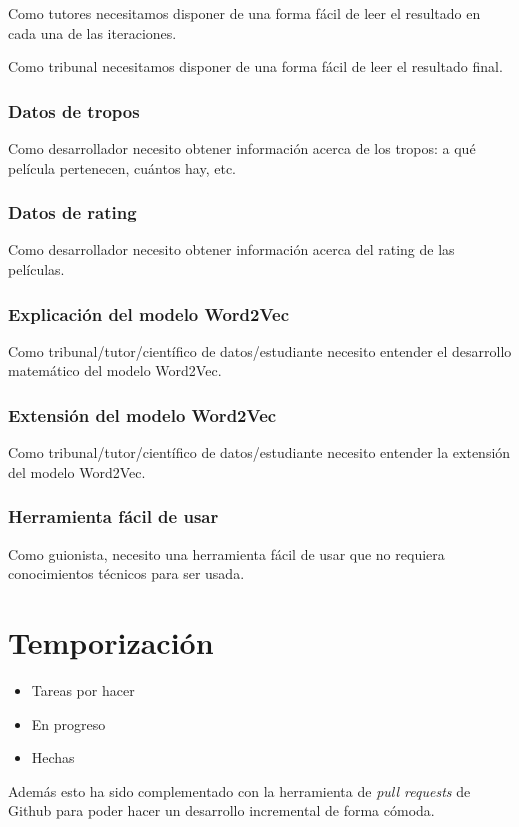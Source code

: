 Como tutores necesitamos disponer de una forma fácil de leer el resultado en cada
una de las iteraciones.

Como tribunal necesitamos disponer de una forma fácil de leer el resultado final.

\subsubsection*{Datos de tropos}\label{uc:trope_data}

Como desarrollador necesito obtener información acerca de los
tropos: a qué película pertenecen, cuántos hay, etc.

\subsubsection*{Datos de rating}\label{uc:rating_data}

Como desarrollador necesito obtener información acerca del rating
de las películas.

\subsubsection*{Explicación del modelo Word2Vec}\label{uc:math}

Como tribunal/tutor/científico de datos/estudiante
necesito entender el desarrollo matemático del modelo Word2Vec.

\subsubsection*{Extensión del modelo Word2Vec}\label{uc:math_extension}

Como tribunal/tutor/científico de datos/estudiante
necesito entender la extensión del modelo Word2Vec.

\subsubsection*{Herramienta fácil de usar}\label{uc:user_friendly_tool}

Como guionista, necesito una herramienta
fácil de usar que no requiera conocimientos técnicos para ser usada.

\section{Temporización}
\begin{itemize}
    \item Tareas por hacer
    \item En progreso
    \item Hechas
\end{itemize}

Además esto ha sido complementado con la herramienta de \textit{pull requests} de Github para poder hacer
un desarrollo incremental de forma cómoda.
